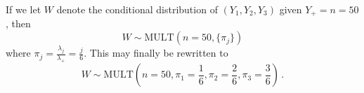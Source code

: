 \documentclass[12pt]{fphw}[final]
\begin{document}
\begin{enumerate}
    If we let $W$ denote the conditional distribution of $(Y_1,Y_2,Y_3)$ given $Y_{+} = n = 50$, then
    \begin{equation}
         W \sim \mathrm{MULT}(n=50, \{\pi_j\})
    \end{equation}
    where $\pi_j = \frac{\lambda_j}{\lambda_{+}} = \frac{j}{6}$. This may finally be rewritten to
    \begin{equation}
        W \sim \mathrm{MULT}\!\left(n=50, \pi_1=\frac{1}{6}, \pi_2=\frac{2}{6}, \pi_3=\frac{3}{6}\right)\,.
    \end{equation}
\end{enumerate}
	
\end{document}
